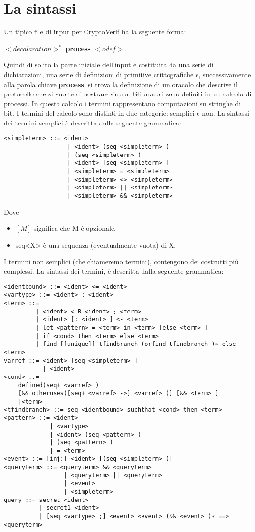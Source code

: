 \documentclass[a4paper,openright,twoside,12pt]{report}
\begin{document}
\section{La sintassi}
Un tipico file di input per CryptoVerif ha la seguente forma: \begin{center}
                                                               $<decalaration>^{*} $ \textbf{process} $  <odef>$.
                                                              \end{center}
Quindi di solito la parte iniziale dell'input \`e costituita da una serie di dichiarazioni, una serie di definizioni di primitive crittografiche e, successivamente alla parola chiave \textbf{process}, 
si trova la definizione di un oracolo che descrive il protocollo che si vuolte dimostrare sicuro.
Gli oracoli sono definiti in un calcolo di processi. In questo calcolo i termini rappresentano computazioni su stringhe di bit.
I termini del calcolo sono distinti in due categorie: semplici e non. La sintassi dei termini semplici \`e descritta dalla seguente grammatica:
\begin{verbatim}
<simpleterm> ::= <ident>
                  | <ident> (seq <simpleterm> )
                  | (seq <simpleterm> )
                  | <ident> [seq <simpleterm> ]
                  | <simpleterm> = <simpleterm>
                  | <simpleterm> <> <simpleterm>
                  | <simpleterm> || <simpleterm>
                  | <simpleterm> && <simpleterm>
\end{verbatim}
Dove
\begin{itemize}
 \item $[M]$ significa che M \`e opzionale.
 \item seq<X> \`e una sequenza (eventualmente vuota) di X.
\end{itemize}
I termini non semplici (che chiameremo termini), contengono dei costrutti pi\`u complessi.
La sintassi dei termini, \`e descritta dalla seguente grammatica:
\begin{verbatim}
<identbound> ::= <ident> <= <ident>
<vartype> ::= <ident> : <ident>
<term> ::= 
         | <ident> <-R <ident> ; <term>
         | <ident> [: <ident> ] <- <term>
         | let <pattern> = <term> in <term> [else <term> ]
         | if <cond> then <term> else <term>
         | find [[unique]] tfindbranch (orfind tfindbranch )∗ else <term>
varref ::= <ident> [seq <simpleterm> ]
           | <ident>
<cond> ::= 
    defined(seq+ <varref> ) 
    [&& otheruses([seq+ <varref> ->] <varref> )] [&& <term> ] 
    |<term>
<tfindbranch> ::= seq <identbound> suchthat <cond> then <term>
<pattern> ::= <ident>
             | <vartype>
             | <ident> (seq <pattern> )
             | (seq <pattern> )
             | = <term>
<event> ::= [inj:] <ident> [(seq <simpleterm> )]
<queryterm> ::= <queryterm> && <queryterm>
                 | <queryterm> || <queryterm>
                 | <event>
                 | <simpleterm>
query ::= secret <ident>
          | secret1 <ident>
          | [seq <vartype> ;] <event> <event> (&& <event> )∗ ==> <queryterm>
\end{verbatim}
\end{document}
